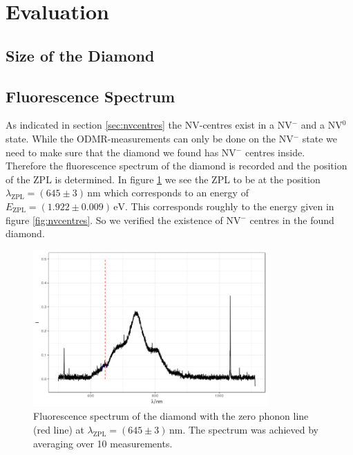 \section{Evaluation}
\subsection{Size of the Diamond}

\subsection{Fluorescence Spectrum}
As indicated in section \ref{sec:nvcentres} the NV-centres exist in a NV$^-$ and a NV$^0$ state. While the ODMR-measurements can only be done on the NV$^-$ state we need to make sure that the diamond we found has NV$^-$ centres inside.\\

Therefore the fluorescence spectrum of the diamond is recorded and the position of the ZPL is determined. In figure \ref{fig:fluorescence} we see the ZPL to be at the position $\lambda_\text{ZPL}=(645\pm3)\,\mathrm{nm}$ which corresponds to an energy of $E_\text{ZPL}=(1.922\pm0.009)\,\mathrm{eV}$. This corresponds roughly to the energy given in figure \ref{fig:nvcentres}. So we verified the existence of NV$^-$ centres in the found diamond.
\begin{figure}
	\centering
	\includegraphics[width=0.8\textwidth]{../figures/fluorescence.png}
	\caption[Fluorescence spectrum of the diamond]{Fluorescence spectrum of the diamond with the zero phonon line (red line) at $\lambda_\text{ZPL}=(645\pm3)\,\mathrm{nm}$. The spectrum was achieved by averaging over 10 measurements.}
	\label{fig:fluorescence}
\end{figure}

